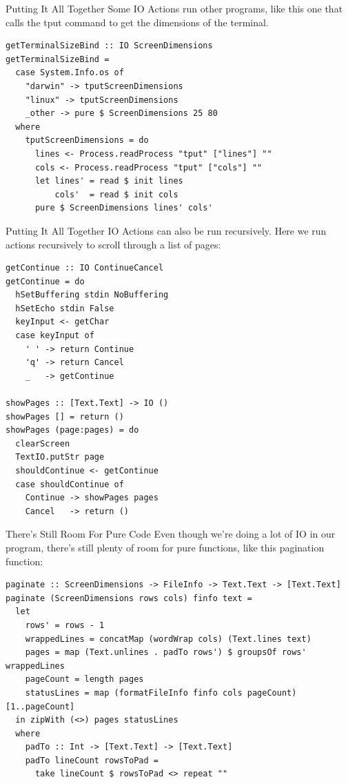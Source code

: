 \documentclass[10pt, presentation, colorlinks]{beamer}
\begin{document}
\begin{frame}[label={sec:org9235d82},fragile]{Putting It All Together}
 Some IO Actions run other programs, like this one that calls the
\alert{tput} command to get the dimensions of the terminal.

\begin{verbatim}
getTerminalSizeBind :: IO ScreenDimensions
getTerminalSizeBind =
  case System.Info.os of
    "darwin" -> tputScreenDimensions
    "linux" -> tputScreenDimensions
    _other -> pure $ ScreenDimensions 25 80
  where
    tputScreenDimensions = do
      lines <- Process.readProcess "tput" ["lines"] ""
      cols <- Process.readProcess "tput" ["cols"] ""
      let lines' = read $ init lines
          cols'  = read $ init cols
      pure $ ScreenDimensions lines' cols'
\end{verbatim}
\end{frame}

\begin{frame}[label={sec:org15d0eed},fragile]{Putting It All Together}
 IO Actions can also be run recursively. Here we run actions
recursively to scroll through a list of pages:

\begin{verbatim}
getContinue :: IO ContinueCancel
getContinue = do
  hSetBuffering stdin NoBuffering
  hSetEcho stdin False
  keyInput <- getChar
  case keyInput of
    ' ' -> return Continue
    'q' -> return Cancel
    _   -> getContinue

showPages :: [Text.Text] -> IO ()
showPages [] = return ()
showPages (page:pages) = do
  clearScreen
  TextIO.putStr page
  shouldContinue <- getContinue
  case shouldContinue of
    Continue -> showPages pages
    Cancel   -> return ()
\end{verbatim}
\end{frame}

\begin{frame}[label={sec:org3961632},fragile]{There's Still Room For Pure Code}
 Even though we're doing a lot of IO in our program, there's still
plenty of room for pure functions, like this pagination function:

\bigskip

\begin{verbatim}
paginate :: ScreenDimensions -> FileInfo -> Text.Text -> [Text.Text]
paginate (ScreenDimensions rows cols) finfo text =
  let
    rows' = rows - 1
    wrappedLines = concatMap (wordWrap cols) (Text.lines text)
    pages = map (Text.unlines . padTo rows') $ groupsOf rows' wrappedLines
    pageCount = length pages
    statusLines = map (formatFileInfo finfo cols pageCount) [1..pageCount]
  in zipWith (<>) pages statusLines
  where
    padTo :: Int -> [Text.Text] -> [Text.Text]
    padTo lineCount rowsToPad =
      take lineCount $ rowsToPad <> repeat ""
\end{verbatim}
\end{frame}
\end{document}
